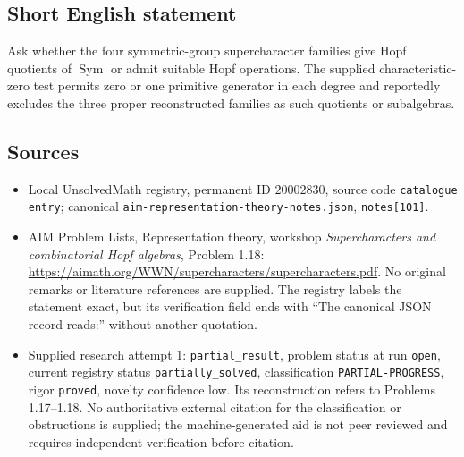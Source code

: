 \documentclass[11pt]{article}
\begin{document}
\subsection{Short English statement}
Ask whether the four symmetric-group supercharacter families give Hopf quotients of $\operatorname{Sym}$ or admit suitable Hopf operations. The supplied characteristic-zero test permits zero or one primitive generator in each degree and reportedly excludes the three proper reconstructed families as such quotients or subalgebras.
\subsection{Sources}
\begin{itemize}
\item Local UnsolvedMath registry, permanent ID $20002830$, source code \texttt{catalogue entry}; canonical \texttt{aim-representation-theory-notes.json}, \texttt{notes[101]}.
\item AIM Problem Lists, Representation theory, workshop \emph{Supercharacters and combinatorial Hopf algebras}, Problem 1.18: \url{https://aimath.org/WWN/supercharacters/supercharacters.pdf}. No original remarks or literature references are supplied. The registry labels the statement exact, but its verification field ends with ``The canonical JSON record reads:'' without another quotation.
\item Supplied research attempt 1: \texttt{partial\_result}, problem status at run \texttt{open}, current registry status \texttt{partially\_solved}, classification \texttt{PARTIAL-PROGRESS}, rigor \texttt{proved}, novelty confidence low. Its reconstruction refers to Problems 1.17--1.18. No authoritative external citation for the classification or obstructions is supplied; the machine-generated aid is not peer reviewed and requires independent verification before citation.
\end{itemize}
\end{document}
